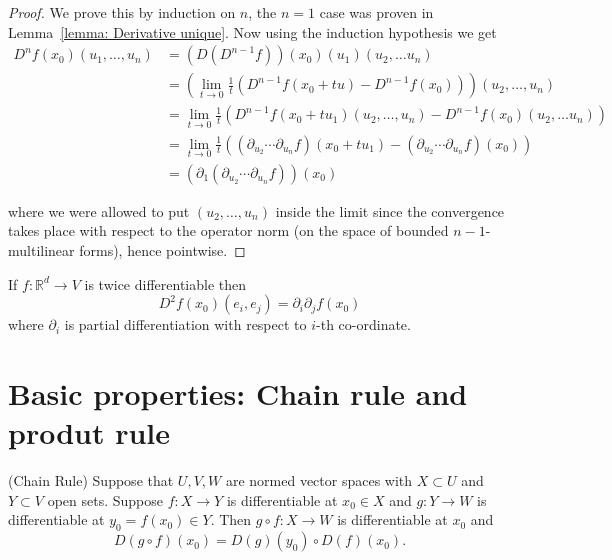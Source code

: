 \documentclass[twoside, a4paper, 10pt]{amsart}
\begin{document}
\begin{proof} We prove this by induction on $n$, the $n=1$ case was proven in Lemma~\ref{lemma: Derivative unique}. Now using the induction hypothesis we get
\begin{align*} 
D^nf(x_0)(u_1, \ldots, u_n) &= \left( D(D^{n-1}f) \right) (x_0)(u_1)(u_2, \ldots u_n) \\ 
&= \left( \lim_{t \to 0} \frac{1}{t} \left(D^{n-1}f(x_0+tu) - D^{n-1}f(x_0) \right) \right) (u_2, \ldots, u_n) \\
&= \lim_{t \to 0} \frac{1}{t} \left(D^{n-1}f(x_0+tu_1)(u_2, \ldots, u_n) - D^{n-1}f(x_0)(u_2, \ldots u_n) \right)\\
&=\lim_{t \to 0} \frac{1}{t} \left( (\partial_{u_2} \cdots \partial_{u_n}f)(x_0+tu_1) - (\partial_{u_2} \cdots \partial_{u_n}f)(x_0)  \right) \\
&= (\partial_1(\partial_{u_2} \cdots \partial_{u_n}f)) (x_0)
\end{align*}

where we were allowed to put $(u_2, \ldots, u_n)$ inside the limit since the convergence takes place with respect to the operator norm (on the space of bounded $n-1$-multilinear forms), hence pointwise. \end{proof}

\begin{corol}\label{corol: second derivative is iterated derivative} If $f: \mathbb{R}^d \to V$ is twice differentiable then $$ D^2 f (x_0) (e_i, e_j) = \partial_i \partial_j f(x_0)$$ where $\partial_i$ is partial differentiation with respect to $i$-th co-ordinate. \end{corol}

\section{Basic properties: Chain rule and produt rule}

\begin{lemma}(Chain Rule) Suppose that $U,V,W$ are normed vector spaces with $X \subset U$ and $Y \subset V$ open sets. Suppose $f:X \to Y$ is differentiable at $x_0 \in X$ and $g:Y \to W$ is differentiable at $y_0 = f(x_0) \in Y$. Then $g \circ f:X \to W$ is differentiable at $x_0$ and $$D(g \circ f)(x_0) = D(g)(y_0) \circ D(f)(x_0).$$ \end{lemma}
\end{document}
